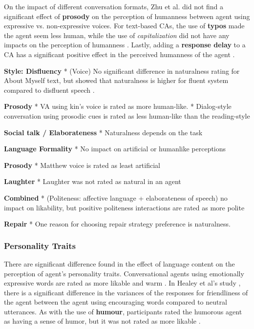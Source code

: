 \documentclass[sigconf,screen,review, anonymous]{acmart}
\newcommand{\cmt}[1]{}%
\begin{document}
On the impact of different conversation formats, Zhu et al. did not find a significant effect of \textbf{prosody} on the perception of humanness between agent using expressive vs. non-expressive voices. For text-based CAs, the use of \textbf{typos} made the agent seem less human, while the use of \textit{capitalization} did not have any impacts on the perception of humanness \cite{westerman2019believe}\cmt{[9]}. Lastly, adding a \textbf{response delay} to a CA has a significant positive effect in the perceived humanness of the agent \cite{gnewuch2018faster}\cmt{[19]}. 


\textbf{Style: Disfluency}
* (Voice) No significant difference in naturalness rating for About Myself text, but showed that naturalness is higher for fluent system compared to disfluent speech \cite{wester2015artificial}\cmt{[14]}.

\textbf{Prosody}
* VA using kin's voice is rated as more human-like. \cite{chan2021kinvoices}\cmt{[74]}
* Dialog-style conversation using prosodic cues is rated as less human-like than the reading-style \cite{misu2011toward}\cmt{[83]}

\textbf{Social talk / Elaborateness}
* Naturalness depends on the task \cite{haas2022keep}\cmt{[78]}

\textbf{Language Formality}
* No impact on artificial or humanlike perceptions \cite{jestin2022effects}\cmt{[81]}

\textbf{Prosody}
* Matthew voice is rated as least artificial  \cite{jestin2022effects}\cmt{[81]}

\textbf{Laughter}
* Laughter was not rated as natural in an agent \cite{niewiadomski2013laugh}\cmt{[85]}

\textbf{Combined}
* (Politeness: affective language + elaborateness of speech) no impact on likability, but positive politeness interactions are rated as more polite \cite{hu2022polite}\cmt{[76]}

\textbf{Repair}
* One reason for choosing repair strategy preference is naturalness. \cite{ashktorab2019resilient}\cmt{[88]}


\subsubsection{Personality Traits}

There are significant difference found in the effect of language content on the perception of agent's personality traits. Conversational agents using emotionally expressive words are rated as more likable \cite{zhu2022effects}\cmt{[26]} and warm \cite{lee2019s}\cmt{[55]}. In Healey et al's study \cite{healey2013relating}\cmt{[39]}, there is a significant difference in the variances of the responses for friendliness of the agent between the agent using encouraging words compared to neutral utterances. As with the use of \textbf{humour}, participants rated the humorous agent as having a sense of humor, but it was not rated as more likable \cite{ceha2021can}\cmt{[57]}.
\end{document}

